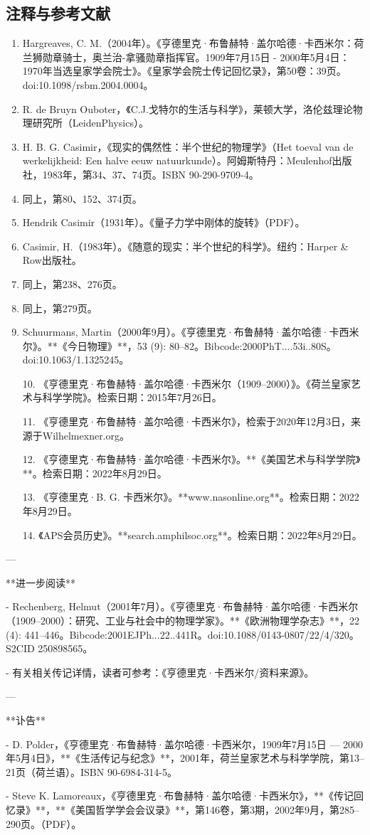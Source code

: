 \subsection{注释与参考文献}
\begin{enumerate}
\item Hargreaves, C. M.（2004年）。《亨德里克·布鲁赫特·盖尔哈德·卡西米尔：荷兰狮勋章骑士，奥兰治-拿骚勋章指挥官。1909年7月15日 - 2000年5月4日：1970年当选皇家学会院士》。《皇家学会院士传记回忆录》，第50卷：39页。doi:10.1098/rsbm.2004.0004。
\item R. de Bruyn Ouboter，《C.J.戈特尔的生活与科学》，莱顿大学，洛伦兹理论物理研究所（LeidenPhysics）。
\item H. B. G. Casimir，《现实的偶然性：半个世纪的物理学》（Het toeval van de werkelijkheid: Een halve eeuw natuurkunde）。阿姆斯特丹：Meulenhof出版社，1983年，第34、37、74页。ISBN 90-290-9709-4。
\item 同上，第80、152、374页。
\item Hendrik Casimir（1931年）。《量子力学中刚体的旋转》（PDF）。
\item Casimir, H.（1983年）。《随意的现实：半个世纪的科学》。纽约：Harper & Row出版社。
\item 同上，第238、276页。
\item 同上，第279页。
\item Schuurmans, Martin（2000年9月）。《亨德里克·布鲁赫特·盖尔哈德·卡西米尔》。**《今日物理》**，53 (9): 80–82。Bibcode:2000PhT....53i..80S。doi:10.1063/1.1325245。

10. 《亨德里克·布鲁赫特·盖尔哈德·卡西米尔（1909–2000）》。《荷兰皇家艺术与科学学院》。检索日期：2015年7月26日。

11. 《亨德里克·布鲁赫特·盖尔哈德·卡西米尔》，检索于2020年12月3日，来源于Wilhelmexner.org。

12. 《亨德里克·布鲁赫特·盖尔哈德·卡西米尔》。**《美国艺术与科学学院》**。检索日期：2022年8月29日。

13. 《亨德里克·B. G. 卡西米尔》。**www.nasonline.org**。检索日期：2022年8月29日。

14. 《APS会员历史》。**search.amphilsoc.org**。检索日期：2022年8月29日。
\end{enumerate}

---

**进一步阅读**

- Rechenberg, Helmut（2001年7月）。《亨德里克·布鲁赫特·盖尔哈德·卡西米尔（1909–2000）：研究、工业与社会中的物理学家》。**《欧洲物理学杂志》**，22 (4): 441–446。Bibcode:2001EJPh...22..441R。doi:10.1088/0143-0807/22/4/320。S2CID 250898565。

- 有关相关传记详情，读者可参考：《亨德里克·卡西米尔/资料来源》。

---

**讣告**

- D. Polder，《亨德里克·布鲁赫特·盖尔哈德·卡西米尔，1909年7月15日 — 2000年5月4日》，**《生活传记与纪念》**，2001年，荷兰皇家艺术与科学学院，第13–21页（荷兰语）。ISBN 90-6984-314-5。

- Steve K. Lamoreaux，《亨德里克·布鲁赫特·盖尔哈德·卡西米尔》，**《传记回忆录》**，**《美国哲学学会会议录》**，第146卷，第3期，2002年9月，第285–290页。（PDF）。